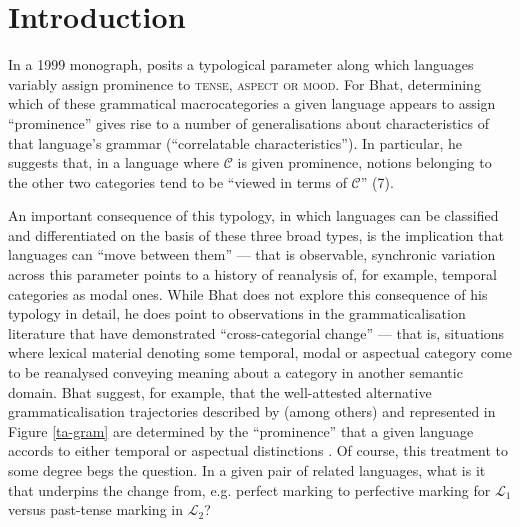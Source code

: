 
\chapter{Introduction}

In a 1999 monograph, \citeauthor{Bhat1999} posits a typological parameter along which languages variably assign prominence to \textsc{tense, aspect \textup{or} mood}. For Bhat, determining which of these grammatical macrocategories a given language appears to assign ``prominence'' gives rise to a number of generalisations about characteristics of that language's grammar (``correlatable characteristics''). In particular, he suggests that, in a language where $ \mathcal C $ is given prominence, notions belonging to the other two categories tend to be ``viewed in terms of $ \mathcal C $'' (7).


An important consequence of this typology, in which languages can be classified and differentiated on the basis of these three broad types, is the implication that languages can ``move between them'' --- that is observable, synchronic variation across this parameter points to a history of reanalysis of, for example, temporal categories as modal ones. While Bhat does not explore this consequence of his typology in detail, he does point to observations in the grammaticalisation literature that have demonstrated ``cross-categorial change'' --- that is, situations where lexical material denoting some temporal, modal or aspectual category come to be reanalysed conveying meaning about a category in another semantic domain. Bhat suggest, for example, that the well-attested alternative grammaticalisation trajectories described by \cite{Bybee1994} (among others) and represented in Figure \ref{ta-gram} are determined by the ``prominence'' that a given language accords to either temporal or aspectual distinctions \citeyearpar[182]{Bhat1999}. Of course, this treatment to some degree begs the question. In a given pair of related languages, what is it that underpins the change from, e.g. perfect marking to perfective marking for $ \mathcal L_1 $ versus past-tense marking in $ \mathcal{L}_2 $?

